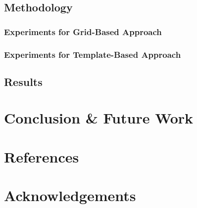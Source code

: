 \documentclass[10pt, titlepage]{article}
\theoremstyle{definition}
\begin{document}
\subsection{Methodology}
\subsubsection{Experiments for Grid-Based Approach}
\subsubsection{Experiments for Template-Based Approach}
\subsection{Results}

\newpage
\section{Conclusion \& Future Work}

\newpage
\section{References}
\nocite{*}



\newpage
\section{Acknowledgements}

\newpage
\appendix
\end{document}
